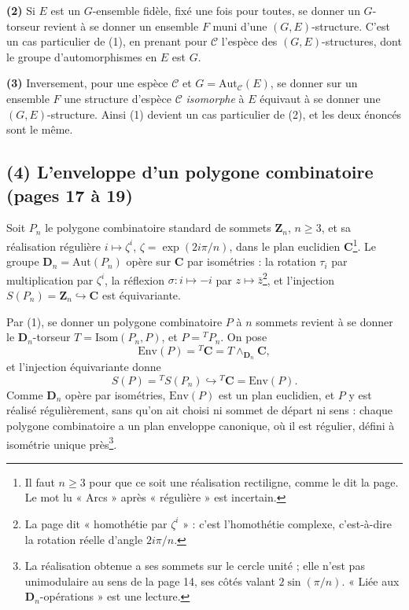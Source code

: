 \documentclass[11pt,a4paper]{article}
\begin{document}
\textbf{(2)} Si $E$ est un $G$-ensemble fidèle, fixé une fois pour toutes,
se donner un $G$-torseur revient à se donner un ensemble $F$ muni d'une
$(G, E)$-structure. C'est un cas particulier de (1), en prenant pour
$\mathcal{C}$ l'espèce des $(G, E)$-structures, dont le groupe
d'automorphismes en $E$ est $G$.

\textbf{(3)} Inversement, pour une espèce $\mathcal{C}$ et $G =
\mathrm{Aut}_{\mathcal{C}}(E)$, se donner sur un ensemble $F$ une structure
d'espèce $\mathcal{C}$ \emph{isomorphe} à $E$ équivaut à se donner une
$(G, E)$-structure. Ainsi (1) devient un cas particulier de (2), et les deux
énoncés sont le même.

\subsection*{(4) L'enveloppe d'un polygone combinatoire (pages 17 à 19)}

Soit $P_n$ le polygone combinatoire standard de sommets $\mathbf{Z}_n$,
$n \geq 3$, et sa réalisation régulière $i \mapsto \zeta^i$, $\zeta =
\exp(2 i\pi/n)$, dans le plan euclidien $\mathbf{C}$\footnote{Il faut $n \geq
3$ pour que ce soit une réalisation rectiligne, comme le dit la page. Le mot lu
« Arcs » après « régulière » est incertain.}. Le groupe $\mathbf{D}_n =
\mathrm{Aut}(P_n)$ opère sur $\mathbf{C}$ par isométries : la rotation $\tau_i$
par multiplication par $\zeta^i$, la réflexion $\sigma : i \mapsto -i$ par
$z \mapsto \bar{z}$\footnote{La page dit « homothétie par $\zeta^i$ » : c'est
l'homothétie complexe, c'est-à-dire la rotation réelle d'angle
$2i\pi/n$.}, et l'injection $S(P_n) = \mathbf{Z}_n \hookrightarrow \mathbf{C}$ est
équivariante.

Par (1), se donner un polygone combinatoire $P$ à $n$ sommets revient à se
donner le $\mathbf{D}_n$-torseur $T = \mathrm{Isom}(P_n, P)$, et $P =
{}^{T}P_n$. On pose
\[
  \mathrm{Env}(P) = {}^{T}\mathbf{C} = T \wedge_{\mathbf{D}_n} \mathbf{C},
\]
et l'injection équivariante donne
\[
  S(P) = {}^{T}S(P_n) \hookrightarrow {}^{T}\mathbf{C} = \mathrm{Env}(P).
\]
Comme $\mathbf{D}_n$ opère par isométries, $\mathrm{Env}(P)$ est un plan
euclidien, et $P$ y est réalisé régulièrement, sans qu'on ait choisi ni sommet
de départ ni sens : chaque polygone combinatoire a un plan enveloppe canonique,
où il est régulier, défini à isométrie unique près\footnote{La réalisation
obtenue a ses sommets sur le cercle unité ; elle n'est pas unimodulaire au
sens de la page 14, ses côtés valant $2\sin(\pi/n)$. « Liée aux
$\mathbf{D}_n$-opérations » est une lecture.}.
\end{document}
